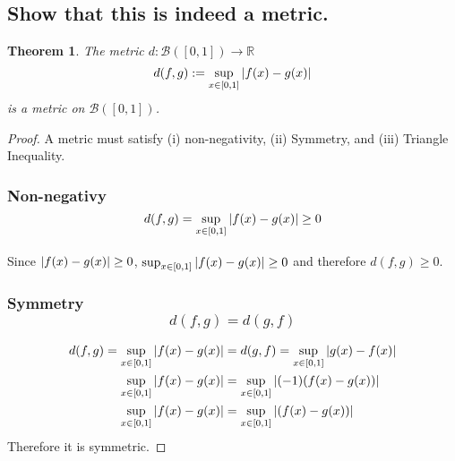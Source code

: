 \documentclass[]{article}
\newcommand{\R}{\mathbb{R}}
\newtheorem{theorem}{Theorem}
\begin{document}
\subsection{Show that this is indeed a metric.}

\begin{theorem}
    The metric $d : \mathcal{B}([0,1]) \to \R$
    \[d(f,g) := \sup_{x \in [0,1]} \abs{f(x) - g(x)}\]
    is a metric on $\mathcal{B}([0,1])$.
\end{theorem}
\begin{proof}
    A metric must satisfy (i) non-negativity, 
    (ii) Symmetry, and (iii) Triangle Inequality.
    \subsubsection{Non-negativy \[d(f,g) = \sup_{x \in [0,1]} \abs{f(x) - g(x)} \geq 0\]}
        Since $\abs{f(x) - g(x)} \geq 0$, $\sup_{x \in [0,1]} \abs{f(x) - g(x)} \geq 0$ and therefore $d(f,g) \geq 0$.
    \subsubsection{Symmetry \[d(f,g) = d(g,f)\]}
    \begin{align*}
        d(f,g) = \sup_{x \in [0,1]} \abs{f(x) - g(x)} &= d(g,f) = \sup_{x \in [0,1]} \abs{g(x) - f(x)}\\
        \sup_{x \in [0,1]} \abs{f(x) - g(x)} &= \sup_{x \in [0,1]} \abs{(-1)(f(x) -g(x))}\\
        \sup_{x \in [0,1]} \abs{f(x) - g(x)} &= \sup_{x \in [0,1]} \abs{(f(x) -g(x))}
    \end{align*}
    Therefore it is symmetric.

\end{proof}
\end{document}
